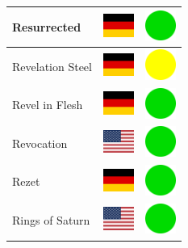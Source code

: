 \documentclass[12pt, a4paper, twoside]{report}
\begin{document}
\begin{center}
\begin{longtable}{|p{5cm}|p{2cm}|p{2cm}|}
Resurrected & \includegraphics[width=1cm]{4x3/de} & \includegraphics[width=1cm]{likes/y} \\ \hline
Revelation Steel & \includegraphics[width=1cm]{4x3/de} & \includegraphics[width=1cm]{likes/m} \\ \hline
Revel in Flesh & \includegraphics[width=1cm]{4x3/de} & \includegraphics[width=1cm]{likes/y} \\ \hline
Revocation & \includegraphics[width=1cm]{4x3/us} & \includegraphics[width=1cm]{likes/y} \\ \hline
Rezet & \includegraphics[width=1cm]{4x3/de} & \includegraphics[width=1cm]{likes/y} \\ \hline
Rings of Saturn & \includegraphics[width=1cm]{4x3/us} & \includegraphics[width=1cm]{likes/y} \\ \hline

\end{longtable}
\end{center}
\end{document}
